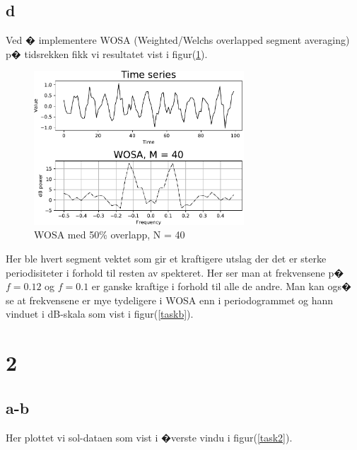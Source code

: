 {\subsection{d}

Ved � implementere WOSA (Weighted/Welchs overlapped segment averaging) p� tidsrekken fikk vi resultatet vist i figur(\ref{taskd}).

\begin{figure}[hbt!]
    {\centering
        \includegraphics[width=0.70\textwidth]{taskd.pdf}
        \caption{WOSA med 50\% overlapp, N = 40}
        \label{taskd}
    \par}
    \end{figure}

Her ble hvert segment vektet som gir et kraftigere utslag der det er sterke periodisiteter i forhold til resten av spekteret. Her ser man at frekvensene p� $f = 0.12$ og $f = 0.1$ er ganske kraftige i forhold til alle de andre. Man kan ogs� se at frekvensene er mye tydeligere i WOSA enn i periodogrammet og hann vinduet i dB-skala som vist i figur(\ref{taskb}). 


\clearpage
\newpage
\section{2}

\subsection{a-b}

Her plottet vi sol-dataen som vist i �verste vindu i figur(\ref{task2}).


}
